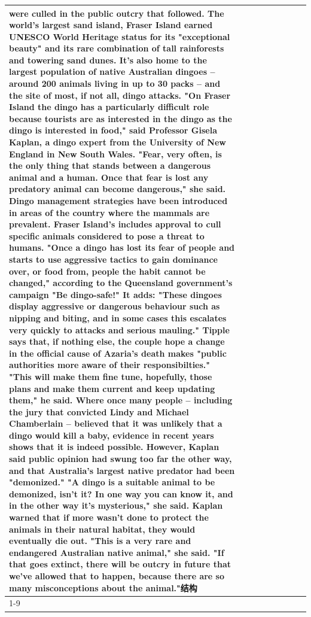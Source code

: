 \begin{table}[H]
\begin{tabular}{lllrlllll}
were culled in the public outcry that followed. The world's largest sand island, Fraser Island earned UNESCO World Heritage status for its "exceptional beauty" and its rare combination of tall rainforests and towering sand dunes. It's also home to the largest population of native Australian dingoes -- around 200 animals living in up to 30 packs -- and the site of most, if not all, dingo attacks. "On Fraser Island the dingo has a particularly difficult role because tourists are as interested in the dingo as the dingo is interested in food," said Professor Gisela Kaplan, a dingo expert from the University of New England in New South Wales. "Fear, very often, is the only thing that stands between a dangerous animal and a human. Once that fear is lost any predatory animal can become dangerous," she said. Dingo management strategies have been introduced in areas of the country where the mammals are prevalent. Fraser Island's includes approval to cull specific animals considered to pose a threat to humans. "Once a dingo has lost its fear of people and starts to use aggressive tactics to gain dominance over, or food from, people the habit cannot be changed," according to the Queensland government's campaign "Be dingo-safe!" It adds: "These dingoes display aggressive or dangerous behaviour such as nipping and biting, and in some cases this escalates very quickly to attacks and serious mauling." Tipple says that, if nothing else, the couple hope a change in the official cause of Azaria's death makes "public authorities more aware of their responsibilties." "This will make them fine tune, hopefully, those plans and make them current and keep updating them," he said. Where once many people -- including the jury that convicted Lindy and Michael Chamberlain -- believed that it was unlikely that a dingo would kill a baby, evidence in recent years shows that it is indeed possible. However, Kaplan said public opinion had swung too far the other way, and that Australia's largest native predator had been "demonized." "A dingo is a suitable animal to be demonized, isn't it? In one way you can know it, and in the other way it's mysterious," she said. Kaplan warned that if more wasn't done to protect the animals in their natural habitat, they would eventually die out. "This is a very rare and endangered Australian native animal," she said. "If that goes extinct, there will be outcry in future that we've allowed that to happen, because there are so many misconceptions about the animal."结构 \\
\cline{1-9}

\end{tabular}
\end{table}
